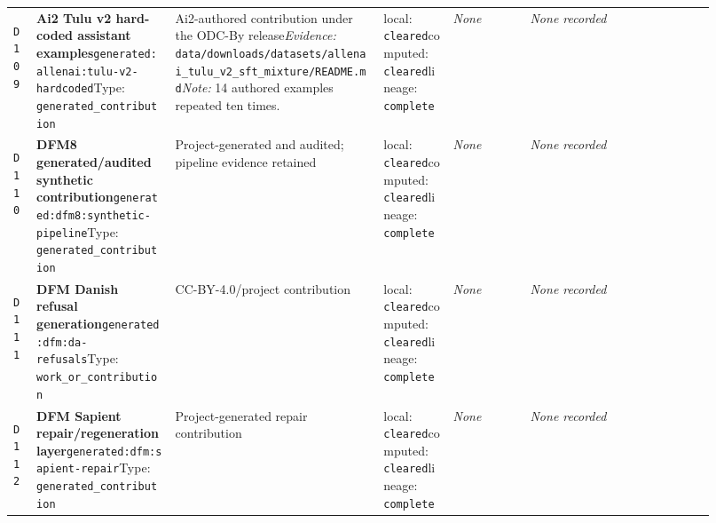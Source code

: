 \documentclass[9pt,a4paper]{article}
\newcommand{\depid}[1]{\hypertarget{dep:#1}{\texttt{#1}}}
\begin{document}
\begin{landscape}
\begin{longtable}{@{}L{0.035\linewidth}L{0.185\linewidth}L{0.27\linewidth}L{0.09\linewidth}L{0.10\linewidth}L{0.24\linewidth}@{}}
\depid{D109} & \textbf{Ai2 Tulu v2 hard-coded assistant examples}\newline \nolinkurl{generated:allenai:tulu-v2-hardcoded}\newline Type: \texttt{generated\_contribution} & Ai2-authored contribution under the ODC-By release\newline \textit{Evidence:} \nolinkurl{data/downloads/datasets/allenai_tulu_v2_sft_mixture/README.md}\newline \textit{Note:} 14 authored examples repeated ten times. & local: \texttt{cleared}\newline computed: \texttt{cleared}\newline lineage: \texttt{complete} & \textit{None} & \textit{None recorded} \\
\depid{D110} & \textbf{DFM8 generated/audited synthetic contribution}\newline \nolinkurl{generated:dfm8:synthetic-pipeline}\newline Type: \texttt{generated\_contribution} & Project-generated and audited; pipeline evidence retained & local: \texttt{cleared}\newline computed: \texttt{cleared}\newline lineage: \texttt{complete} & \textit{None} & \textit{None recorded} \\
\depid{D111} & \textbf{DFM Danish refusal generation}\newline \nolinkurl{generated:dfm:da-refusals}\newline Type: \texttt{work\_or\_contribution} & CC-BY-4.0/project contribution & local: \texttt{cleared}\newline computed: \texttt{cleared}\newline lineage: \texttt{complete} & \textit{None} & \textit{None recorded} \\
\depid{D112} & \textbf{DFM Sapient repair/regeneration layer}\newline \nolinkurl{generated:dfm:sapient-repair}\newline Type: \texttt{generated\_contribution} & Project-generated repair contribution & local: \texttt{cleared}\newline computed: \texttt{cleared}\newline lineage: \texttt{complete} & \textit{None} & \textit{None recorded} \\

\end{longtable}
\end{landscape}
\end{document}
